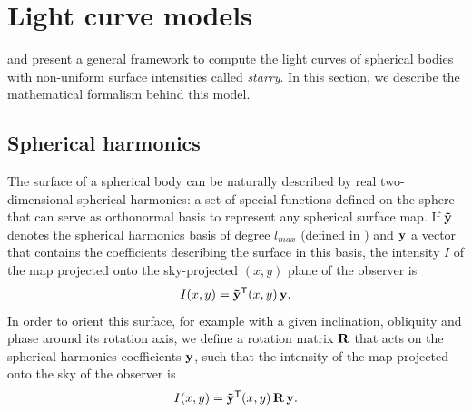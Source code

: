 \documentclass[modern]{aastex631}
\begin{document}
\section{Light curve models}\label{starry}

\cite{starry} and \cite{Agol2020} present a general framework to compute the light curves of spherical bodies with non-uniform surface intensities called \textit{starry}. In this section, we describe the mathematical formalism behind this model.

\subsection{Spherical harmonics}\label{SH}

The surface of a spherical body can be naturally described by real two-dimensional spherical harmonics: a set of special functions defined on the sphere that can serve as orthonormal basis to represent any spherical surface map. If ${\mathbf{\tilde y}}$ denotes the spherical harmonics basis of degree $l_{max}$ (defined in \citealt[section 2.2]{starry}) and ${\mathbf{y}}$ a vector that contains the coefficients describing the surface in this basis, the intensity $I$ of the map projected onto the sky-projected $(x, y)$ plane of the observer is
\begin{equation}\label{eq:I}I(x, y) = \bvec{\tilde y^\mathsf{T}}(x, y) \, \bvec{y}.\end{equation}
In order to orient this surface, for example with a given inclination, obliquity and phase around its rotation axis, we define a rotation matrix ${\mathbf{R}}$ that acts on the spherical harmonics coefficients ${\mathbf{y}}$, such that the intensity of the map projected onto the sky of the observer is
\begin{equation}\label{eq:IR}I(x, y) = \bvec{\tilde y}^\mathsf{T}(x, y) \, \bvec{R} \, \bvec{y}.\end{equation}\\
\end{document}
